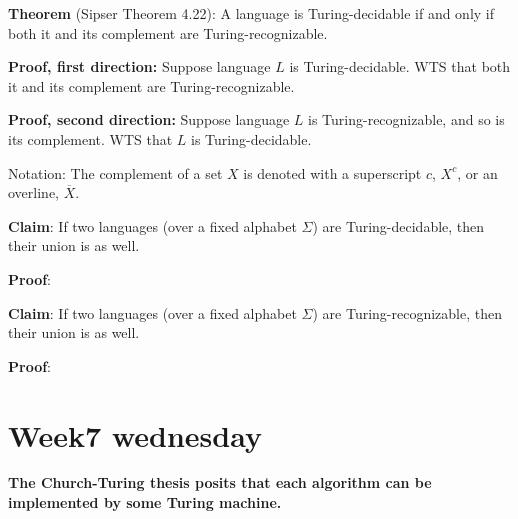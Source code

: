 \documentclass[12pt, oneside]{article}
\begin{document}
\vfill 
{\bf  Theorem} (Sipser Theorem 4.22): A  language is Turing-decidable if and only if both  it and its complement
are Turing-recognizable.

{\bf Proof, first direction:}  Suppose  language  $L$ is  Turing-decidable.   WTS  that both it and its complement 
are Turing-recognizable.

\vfill

{\bf Proof, second direction:}  Suppose  language  $L$ is  Turing-recognizable, and  so is  its complement.   WTS  that $L$
is Turing-decidable.
\vfill


Notation: The complement  of a set $X$ is denoted with  a superscript $c$, $X^c$, or an overline,  $\overline{X}$.

\newpage

{\bf Claim}: If two languages  (over a fixed alphabet  $\Sigma$) are Turing-decidable, then  their union  is  as well.

{\bf Proof}:


\vfill
\newpage

{\bf Claim}: If two languages  (over a fixed alphabet  $\Sigma$) are Turing-recognizable, then  their union  is  as well.

{\bf Proof}:

 \vfill
\section*{Week7 wednesday}


{\bf The Church-Turing thesis posits that each algorithm can be implemented by some Turing machine.}
\end{document}

